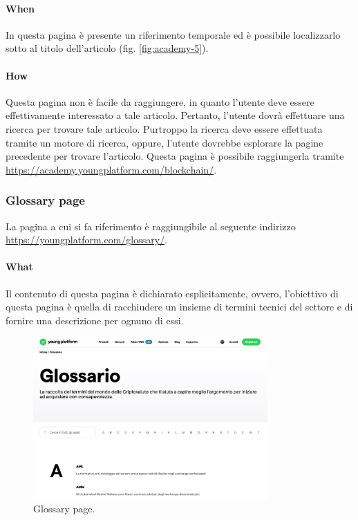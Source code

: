 \paragraph{When}

In questa pagina è presente un riferimento temporale ed è possibile 
localizzarlo sotto al titolo dell'articolo (fig. \ref{fig:academy-5}).

\paragraph{How}

Questa pagina non è facile da raggiungere, in quanto l'utente deve 
essere effettivamente interessato a tale articolo. Pertanto, l'utente 
dovrà effettuare una ricerca per trovare tale articolo. Purtroppo la 
ricerca deve essere effettuata tramite un motore di ricerca, oppure, 
l'utente dovrebbe esplorare la pagine precedente per trovare l'articolo.
Questa pagina è possibile raggiungerla tramite 
\href{https://academy.youngplatform.com/blockchain/}{https://academy.youngplatform.com/blockchain/}.

\subsubsection{Glossary page}

La pagina a cui si fa riferimento è raggiungibile al seguente indirizzo 
\href{https://youngplatform.com/glossary/}{https://youngplatform.com/glossary/}.

\paragraph{What}

Il contenuto di questa pagina è dichiarato esplicitamente, ovvero, 
l'obiettivo di questa pagina è quella di racchiudere un insieme di termini 
tecnici del settore e di fornire una descrizione per ognuno di essi. 

\begin{figure}[H]
  \centering
  \includegraphics[width=0.80\textwidth]{res/images/internal-pages/glossary/glossary-1.png}
  \caption{Glossary page.}
  \label{fig:glossary-1}
\end{figure}

